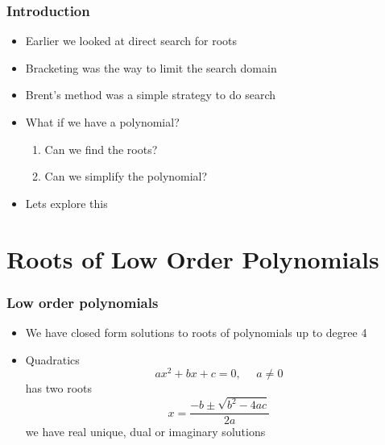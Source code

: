 \documentclass[10pt]{beamer}
\begin{document}
\begin{frame}
  \frametitle{Introduction}
  \begin{itemize}
  \item Earlier we looked at direct search for roots
  \item Bracketing was the way to limit the search domain
  \item Brent's method was a simple strategy to do search
  \item What if we have a polynomial?
    \begin{enumerate}
    \item Can we find the roots?
    \item Can we simplify the polynomial?
    \end{enumerate}
  \item Lets explore this
  \end{itemize}
\end{frame}

\section{Roots of Low Order Polynomials}

\begin{frame}
  \frametitle{Low order polynomials}
  \begin{itemize}
  \item We have closed form solutions to roots of polynomials up to degree 4
  \item Quadratics
    \[
      ax^2 + bx +c = 0, \mbox{~~~~} a\neq0
    \]
    has two roots
    \[
      x = \frac{-b \pm \sqrt{b^2 - 4ac}}{2a}
    \]
    we have real unique, dual or imaginary solutions
  \end{itemize}
\end{frame}
\end{document}
